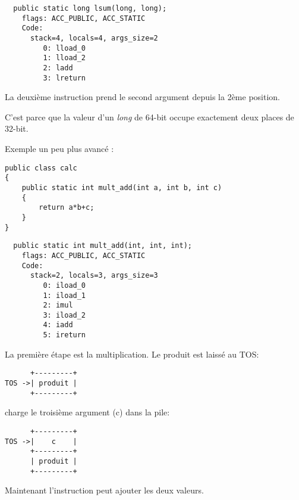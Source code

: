 \begin{lstlisting}
  public static long lsum(long, long);
    flags: ACC_PUBLIC, ACC_STATIC
    Code:
      stack=4, locals=4, args_size=2
         0: lload_0
         1: lload_2
         2: ladd
         3: lreturn
\end{lstlisting}

La deuxième instruction  prend le second argument depuis la 2ème position.

C'est parce que la valeur d'un \emph{long} de 64-bit occupe exactement deux places de 32-bit.


Exemple un peu plus avancé :


\begin{lstlisting}[style=customjava]
public class calc
{
	public static int mult_add(int a, int b, int c)
	{
		return a*b+c;
	}
}
\end{lstlisting}

\begin{lstlisting}
  public static int mult_add(int, int, int);
    flags: ACC_PUBLIC, ACC_STATIC
    Code:
      stack=2, locals=3, args_size=3
         0: iload_0
         1: iload_1
         2: imul
         3: iload_2
         4: iadd
         5: ireturn
\end{lstlisting}

La première étape est la multiplication. Le produit est laissé au \ac{TOS}:


\begin{lstlisting}
      +---------+
TOS ->| produit |
      +---------+
\end{lstlisting}

 charge le troisième argument (c) dans la pile:

\begin{lstlisting}
      +---------+
TOS ->|    c    |
      +---------+
      | produit |
      +---------+
\end{lstlisting}

Maintenant l'instruction  peut ajouter les deux valeurs.

